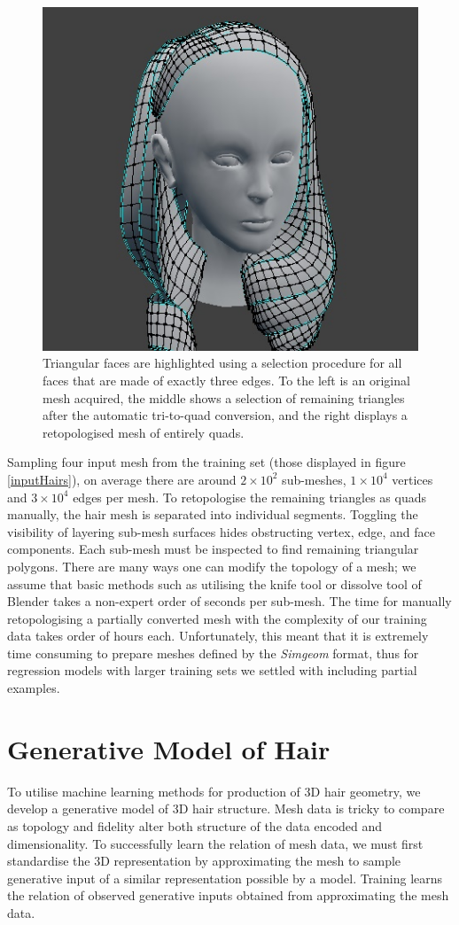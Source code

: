 \documentclass[ %
author={Dillon Keith Diep},
supervisor={Dr. Carl Henrik Ek},
degree={MEng},
title={ART-CG Hair:},
subtitle={Assisted Real-time Content Generation of Stylised Virtual Hair},
type={Research},
year={2017} ]{dissertation}
\begin{document}
\begin{figure}[!h]
	\includegraphics[scale=2]{images/triToQuad3}
	\caption{Triangular faces are highlighted using a selection procedure for all faces that are made of exactly three edges. To the left is an original mesh acquired, the middle shows a selection of remaining triangles after the automatic tri-to-quad conversion, and the right displays a retopologised mesh of entirely quads.}
\end{figure}

Sampling four input mesh from the training set (those displayed in figure \ref{inputHairs}), on average there are around $2 \times 10^{2}$ sub-meshes, $1 \times 10^{4}$ vertices and  $3 \times 10^{4}$ edges per mesh. To retopologise the remaining triangles as quads manually, the hair mesh is separated into individual segments. Toggling the visibility of layering sub-mesh surfaces hides obstructing vertex, edge, and face components. Each sub-mesh must be inspected to find remaining triangular polygons. There are many ways one can modify the topology of a mesh; we assume that basic methods such as utilising the knife tool or dissolve tool of Blender takes a non-expert order of seconds per sub-mesh. The time for manually retopologising a partially converted mesh with the complexity of our training data takes order of hours each. Unfortunately, this meant that it is extremely time consuming to prepare meshes defined by the \textit{Simgeom} format, thus for regression models with larger training sets we settled with including partial examples.

\section{Generative Model of Hair}
To utilise machine learning methods for production of 3D hair geometry,  we develop a generative model of 3D hair structure. Mesh data is tricky to compare as topology and fidelity alter both structure of the data encoded and dimensionality. To successfully learn the relation of mesh data, we must first standardise the 3D representation by approximating the mesh to sample generative input of a similar representation possible by a model. Training learns the relation of observed generative inputs obtained from approximating the mesh data.
\end{document}
